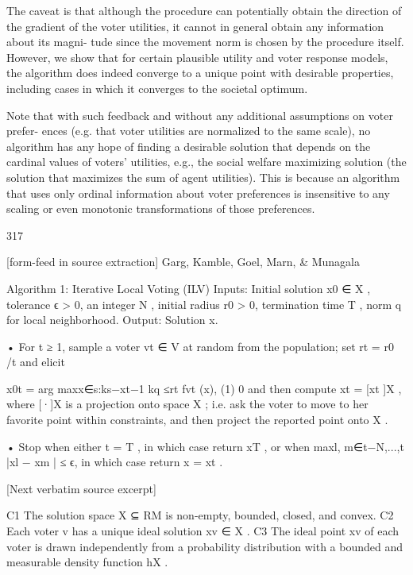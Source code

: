 \documentclass[10pt]{article}
\begin{document}
\begin{ReviewVerbatim}
   The caveat is that although the procedure can potentially obtain the direction of the
gradient of the voter utilities, it cannot in general obtain any information about its magni-
tude since the movement norm is chosen by the procedure itself. However, we show that for
certain plausible utility and voter response models, the algorithm does indeed converge to a
unique point with desirable properties, including cases in which it converges to the societal
optimum.

   Note that with such feedback and without any additional assumptions on voter prefer-
ences (e.g. that voter utilities are normalized to the same scale), no algorithm has any hope
of finding a desirable solution that depends on the cardinal values of voters' utilities, e.g., the
social welfare maximizing solution (the solution that maximizes the sum of agent utilities).
This is because an algorithm that uses only ordinal information about voter preferences is
insensitive to any scaling or even monotonic transformations of those preferences.



                                                 317

[form-feed in source extraction]
                          Garg, Kamble, Goel, Marn, & Munagala


 Algorithm 1: Iterative Local Voting (ILV)
  Inputs: Initial solution x0 ∈ X , tolerance ϵ > 0, an integer N , initial radius r0 > 0,
    termination time T , norm q for local neighborhood.
   Output:     Solution x.

       • For t ≥ 1, sample a voter vt ∈ V at random from the population; set rt = r0 /t
           and elicit


                             x0t = arg maxx∈{s:ks−xt−1 kq ≤rt } fvt (x),             (1)
                                         0
           and then compute xt = [xt ]X , where [·]X is a projection onto space X ; i.e. ask
           the voter to move to her favorite point within constraints, and then project the
           reported point onto X .


       • Stop when either t = T , in which case return xT , or when
         maxl, m∈{t−N,...,t} |xl − xm | ≤ ϵ, in which case return x = xt .

[Next verbatim source excerpt]

 C1 The solution space X ⊆ RM is non-empty, bounded, closed, and convex.
 C2 Each voter v has a unique ideal solution xv ∈ X .
 C3 The ideal point xv of each voter is drawn independently from a probability distribution
      with a bounded and measurable density function hX .



\end{ReviewVerbatim}
\end{document}
